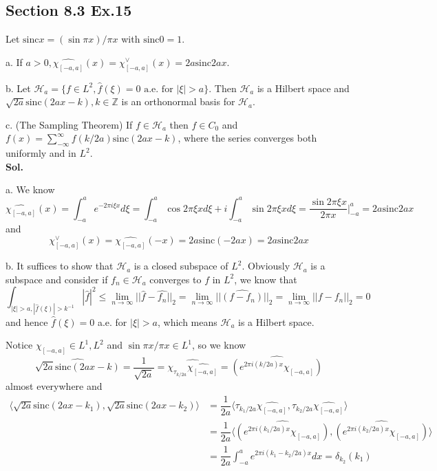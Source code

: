 \documentclass[lang=en,11pt,a4paper,citestyle =authoryear]{elegantpaper}
\newcommand{\Z}{\mathbb{Z}}
\newcommand{\Hil}{\mathcal{H}}
\begin{document}
\subsection*{Section 8.3 Ex.15} 
Let $\text{sinc} x = (\sin \pi x)/\pi x$ with $\text{sinc} 0 =1$.\par
a. If $a>0, \hat{\chi_{[-a,a]}}(x) = \chi_{[-a,a]}^{\vee}(x) = 2a\text{sinc} 2ax$.\par
b. Let $\Hil_{a} = \{f\in L^2, \hat{f}(\xi) = 0\text{ a.e. for }|\xi|>a\}$. Then $\Hil_{a}$ is a Hilbert space and $\sqrt{2a}\text{sinc}(2ax-k),k\in\Z$ is an orthonormal basis for $\Hil_a$.\par
c. (The Sampling Theorem) If $f\in\Hil_{a}$ then $f\in C_0$ and $f(x) = \sum_{-\infty}^{\infty}f(k/2a)\text{sinc}(2ax-k)$, where the series converges both uniformly and in $L^2$.
\vspace{0.5em}\\
\textbf{Sol.} \par
a. We know
\[
\hat{\chi_{[-a,a]}}(x) = \int_{-a}^a e^{-2\pi i \xi x} d\xi = \int_{-a}^a \cos 2\pi \xi x d\xi + i\int_{-a}^a \sin 2\pi \xi x d\xi = \dfrac{\sin 2\pi \xi x}{2\pi x}|^a_{-a} = 2a\text{sinc}2ax
\]
and
\[
\chi_{[-a,a]}^{\vee}(x) = \hat{\chi_{[-a,a]}}(-x)=2a\text{sinc} (-2ax) = 2a\text{sinc} 2ax
\]\par
b. It suffices to show that $\Hil_a$ is a closed subspace of $L^2$. Obviously $\Hil_a$ is a subspace and consider if $f_n \in \Hil_a$ converges to $f$ in $L^2$, we know that
\[
\int_{|\xi|>a,|\hat{f}(\xi)|>k^{-1}} |\hat{f}|^2 \leq \lim_{n\to\infty}||\hat{f}-\hat{f_n}||_2 = \lim_{n\to\infty}||\hat{(f-f_n)}||_2 = \lim_{n\to\infty}||f-f_n||_2 = 0
\]
and hence $\hat{f}(\xi) = 0$ a.e. for $|\xi|>a$, which means $\Hil_a$ is a Hilbert space.\par
Notice $\chi_{[-a,a]} \in L^1,L^2$ and $\sin \pi x/\pi x \in L^1$, so we know
\[
\hat{\sqrt{2a}\text{sinc}(2ax-k)} = \dfrac{1}{\sqrt{2a}} = \hat{\chi_{\tau_{k/2a}}\hat{\chi_{[-a,a]}}} = \hat{(e^{2\pi i(k/2a)x}\chi_{[-a,a]})}
\]
almost everywhere and
\[
\begin{aligned}
\langle \sqrt{2a}\text{sinc}(2ax-k_1), \sqrt{2a}\text{sinc}(2ax-k_2) \rangle &= \dfrac{1}{2a} \langle \tau_{k_1/2a}\hat{\chi_{[-a,a]}},\tau_{k_2/2a}\hat{\chi_{[-a,a]}}\rangle \\
&=\dfrac{1}{2a} \langle \hat{(e^{2\pi i (k_1/2a)x}\chi_{[-a,a]})},\hat{(e^{2\pi i (k_2/2a)x}\chi_{[-a,a]})}\rangle \\
&= \dfrac{1}{2a}\int_{-a}^a e^{2\pi i (k_1-k_2/2a)x}dx = \delta_{k_2}(k_1)
\end{aligned}
\]
\end{document}
